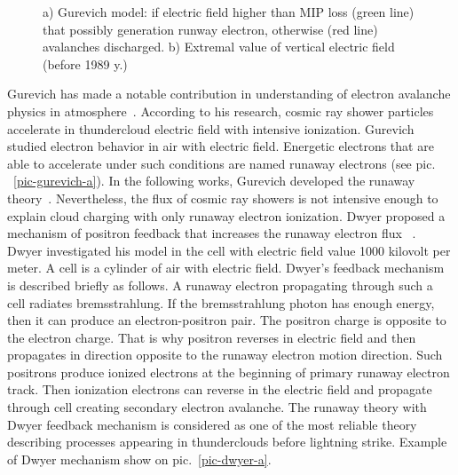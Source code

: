 \documentclass{webofc}
\begin{document}
\begin{figure}[ht!]
\begin{subfigure}[b]{0.5\textwidth}
            \caption{}
            \label{pic-field-b}
        \end{subfigure}
        \caption{
            a) Gurevich model: if electric field higher than MIP loss (green line) that possibly generation runway electron, otherwise (red line) avalanches discharged.
            b) Extremal value of vertical electric field (before 1989 y.)~\cite{mazin1989clouds}}
    \end{figure}
    
    Gurevich has made a notable contribution in understanding of electron avalanche physics in atmosphere~\cite{gurevich1992runaway}. According to his research, cosmic ray shower particles accelerate in thundercloud electric field with intensive ionization. Gurevich studied electron behavior in air with electric field. Energetic electrons that are able to accelerate under such conditions are named runaway electrons (see pic. ~\ref{pic-gurevich-a}). In the following works, Gurevich developed the runaway theory~\cite{gurevich1999lightning,gurevich2001kinetic}. Nevertheless, the flux of cosmic ray showers is not intensive enough to explain cloud charging with only runaway electron ionization.
    Dwyer proposed a mechanism of positron feedback that increases the runaway electron flux ~\cite{dwyer2003fundamental}. Dwyer investigated his model in the cell with electric field value 1000 kilovolt per meter. A cell is a cylinder of air with electric field. Dwyer’s feedback mechanism is described briefly as follows. A runaway electron propagating through such a cell radiates bremsstrahlung. If the bremsstrahlung photon has enough energy, then it can produce an electron-positron pair. The positron charge is opposite to the electron charge. That is why positron reverses in electric field and then propagates in direction opposite to the runaway electron motion direction. Such positrons produce ionized electrons at the beginning of primary runaway electron track. Then ionization electrons can reverse in the electric field and propagate through cell creating secondary electron avalanche. The runaway theory with Dwyer feedback mechanism is considered as one of the most reliable theory describing processes appearing in thunderclouds before lightning strike. Example of Dwyer mechanism show on pic.~\ref{pic-dwyer-a}.
    
\end{document}
